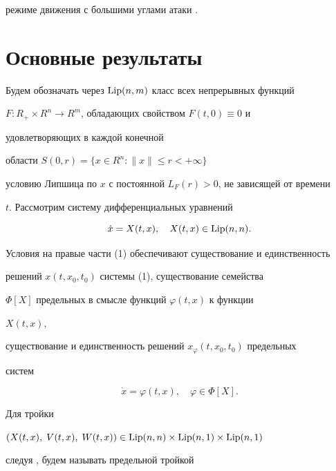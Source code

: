 режиме движения с большими углами атаки \cite{Sir}. 


 


\section{Основные результаты} 


 


Будем обозначать через $\operatorname{Lip}(n,m)$ класс всех непрерывных функций 


$F:R_+\times R^n\to R^m$, обладающих свойством $F(t,0)\equiv 0$ и 


удовлетворяющих в каждой конечной 


области $S(0,r)=\{x\in R^n:\|x\|\le r<+\infty\}$ 


условию Липшица по $x$ с постоянной $L_F(r)>0$, не зависящей от времени 


$t$. Рассмотрим систему дифференциальных уравнений 


\begin{equation} 


\Dot x=X(t,x),\quad X(t,x)\in\Lip (n,n). 


\end{equation} 


 


Условия на правые части (1) обеспечивают существование и единственность 


решений $x(t,x_0,t_0)$ системы (1), существование семейства 


$\Phi[X]$ предельных в смысле \cite{Art1} функций $\varphi(t,x)$ к функции 


$X(t,x)$, 


существование и единственность решений $x_\varphi(t,x_0,t_0)$ предельных 


систем 


\begin{equation} 


\Dot x=\varphi(t,x),\quad \varphi\in\Phi[X]. 


\end{equation} 


 


Для тройки 


$(X(t,x),\;V(t,x),\;W(t,x))\in\operatorname{Lip}(n,n)\times\operatorname{Lip}(n,1)\times\operatorname{Lip}(n,1)$ 


следуя \cite{And}, будем называть предельной тройкой 


